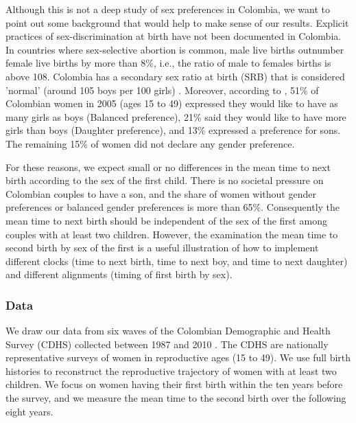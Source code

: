 \documentclass[a4paper,left=1.25cm,right=1.25cm,top=1.25cm,bottom=1.25cm]{article}
\begin{document}
  Although this is not a deep study of sex preferences in Colombia, we want to point out some background that would help to make sense of our results. Explicit practices of sex-discrimination at birth have not been documented in Colombia. In countries where sex-selective abortion is common, male live births outnumber female live births by more than 8\%, i.e., the ratio of male to females births is above 108. Colombia has a secondary sex ratio at birth (SRB) that is considered 'normal' (around 105 boys per 100 girls) \cite{bongaarts2013}. Moreover, according to \citet{fuse2010}, 51\% of Colombian women in 2005 (ages 15 to 49) expressed they would like to have as many girls as boys (Balanced preference), 21\% said they would like to have more girls than boys (Daughter preference), and 13\% expressed a preference for sons. The remaining 15\% of women did not declare any gender preference. 
 
  For these reasons, we expect small or no differences in the mean time to next birth according to the sex of the first child. There is no societal pressure on Colombian couples to have a son, and the share of women without gender preferences or balanced gender preferences is more than 65\%. Consequently the mean time to next birth should be independent of the sex of the first among couples with at least two children. However, the examination the mean time to second birth by sex of the first is a useful illustration of how to implement different clocks (time to next birth, time to next boy, and time to next daughter) and different alignments (timing of first birth by sex).
 
 
\subsubsection{Data}

We draw our data from six waves of the Colombian Demographic and Health Survey (CDHS) collected between 1987 and 2010 \citep{DHS}. The CDHS are nationally representative surveys of women in reproductive ages (15 to 49). We use full birth histories to reconstruct the reproductive trajectory of women with at least two children. We focus on women having their first birth within the ten years before the survey, and we measure the mean time to the second birth over the following eight years.
\end{document}
